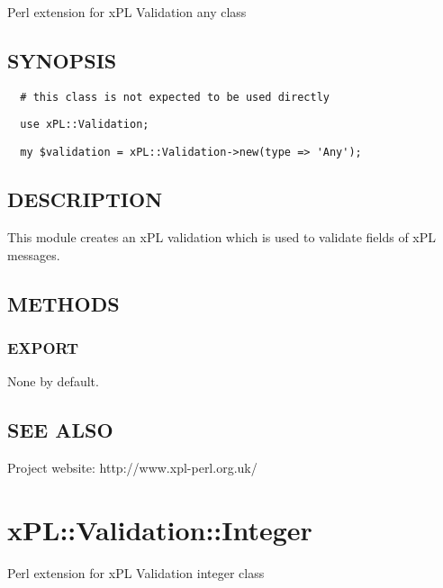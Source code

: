 Perl extension for xPL Validation any class

\subsection*{SYNOPSIS\label{xPL::Validation::Any_SYNOPSIS}}
\begin{verbatim}
  # this class is not expected to be used directly
\end{verbatim}
\begin{verbatim}
  use xPL::Validation;
\end{verbatim}
\begin{verbatim}
  my $validation = xPL::Validation->new(type => 'Any');
\end{verbatim}
\subsection*{DESCRIPTION\label{xPL::Validation::Any_DESCRIPTION}}


This module creates an xPL validation which is used to validate fields
of xPL messages.

\subsection*{METHODS\label{xPL::Validation::Any_METHODS}}
\subsubsection*{EXPORT\label{xPL::Validation::Any_EXPORT}}


None by default.

\subsection*{SEE ALSO\label{xPL::Validation::Any_SEE_ALSO}}


Project website: http://www.xpl-perl.org.uk/

\section{xPL::Validation::Integer\label{xPL::Validation::Integer}}


Perl extension for xPL Validation integer class

